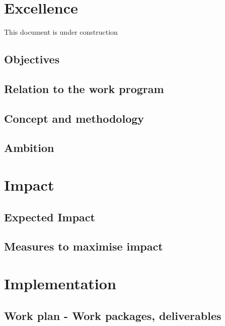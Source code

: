 \documentclass[12pt]{book}
\begin{document}
\chapter{Excellence}

{\Huge \color{red} This document is under construction}

\section{Objectives}



\section{Relation to the work program}



\section{Concept and methodology}



\section{Ambition}

\chapter{Impact}

\section{Expected Impact}



\section{Measures to maximise impact}

\chapter{Implementation}

\section{Work plan - Work packages, deliverables}
\end{document}
